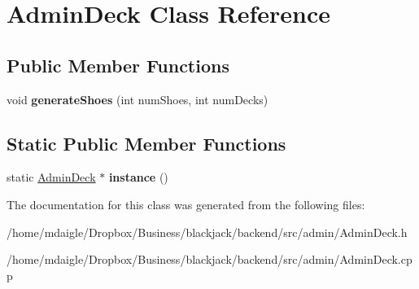 \hypertarget{classAdminDeck}{
\section{\-Admin\-Deck \-Class \-Reference}
\label{d1/d9a/classAdminDeck}
}
\subsection*{\-Public \-Member \-Functions}
\begin{DoxyCompactItemize}
\item 
\hypertarget{classAdminDeck_a60c5e419520a7db61f09af8d1ff8b13d}{
void {\bfseries generate\-Shoes} (int num\-Shoes, int num\-Decks)}
\label{d1/d9a/classAdminDeck_a60c5e419520a7db61f09af8d1ff8b13d}

\end{DoxyCompactItemize}
\subsection*{\-Static \-Public \-Member \-Functions}
\begin{DoxyCompactItemize}
\item 
\hypertarget{classAdminDeck_a25ade36efcec8c7fb918ffc0f6e99bac}{
static \hyperlink{classAdminDeck}{\-Admin\-Deck} $\ast$ {\bfseries instance} ()}
\label{d1/d9a/classAdminDeck_a25ade36efcec8c7fb918ffc0f6e99bac}

\end{DoxyCompactItemize}


\-The documentation for this class was generated from the following files\-:\begin{DoxyCompactItemize}
\item 
/home/mdaigle/\-Dropbox/\-Business/blackjack/backend/src/admin/\-Admin\-Deck.\-h\item 
/home/mdaigle/\-Dropbox/\-Business/blackjack/backend/src/admin/\-Admin\-Deck.\-cpp\end{DoxyCompactItemize}
